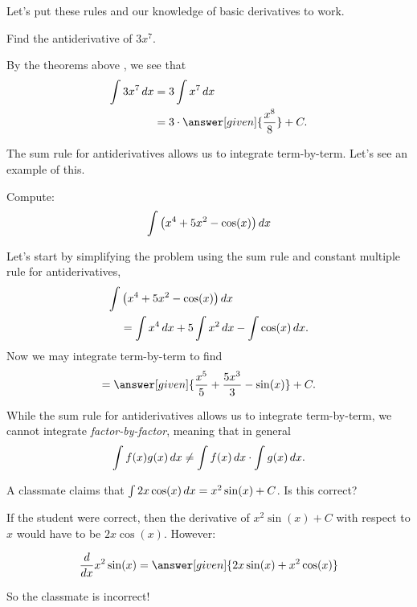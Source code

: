 \documentclass{ximera}
\begin{document}
Let's put these rules and our knowledge of basic derivatives to work.
\begin{example}
Find the antiderivative of $3 x^7$.
\begin{explanation}
By the theorems above , we see that
\begin{align*}
\int 3 x^7 \d x &= 3 \int x^7 \d x\\
&= 3 \cdot \answer[given]{\frac{x^8}{8}}+C.
\end{align*}
\end{explanation}
\end{example}
The sum rule for antiderivatives allows us to integrate
term-by-term. Let's see an example of this.

\begin{example}
Compute:
\[
\int \left(x^4 + 5x^2 - \cos(x)\right) \mathop{}\!d x
\]
\begin{explanation}
Let's start by simplifying the problem using the sum rule 
 and constant multiple rule for antiderivatives, 
\begin{align*}
\int &\left(x^4 + 5x^2 - \cos(x)\right) \mathop{}\!d x\\
&= \int x^4 \mathop{}\!d x + 5\int x^2 \mathop{}\!d x - \int \cos(x) \mathop{}\!d x.
\end{align*}
Now we may integrate term-by-term to find
\[
= \answer[given]{\frac{x^5}{5} + \frac{5x^3}{3}  - \sin(x)}+C.
\]
\end{explanation}
\end{example}


\begin{warning}
While the sum rule for antiderivatives allows us to integrate
term-by-term, we cannot integrate \textit{factor-by-factor}, meaning
that in general
\[
\int f(x)g(x) \mathop{}\!d x \ne \int f(x) \mathop{}\!d x\cdot \int g(x) \mathop{}\!d x.
\]
\end{warning}


\begin{example}
  A classmate claims that $\int 2x \cos(x) \mathop{}\!d x = x^2 \sin(x) +C$. Is this correct?
  
  \begin{explanation}
    If the student were correct, then the derivative of $x^2 \sin(x) +C$ with respect to $x$ would have to be $2x \cos(x)$.  However:
    
      \[\ddx x^2 \sin(x) = \answer[given]{2x \sin(x) +x^2 \cos(x)} \]
      
So the classmate is incorrect!
  \end{explanation}
\end{example}
\end{document}
